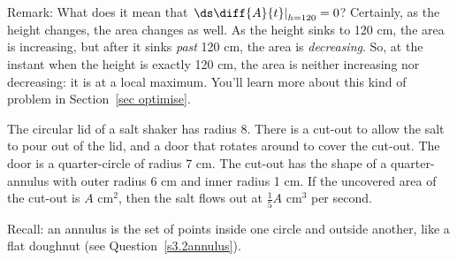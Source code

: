 \begin{solution}
Remark: What does it mean that $\left.\ds\diff{A}{t}\right|_{h=120}=0$? Certainly, as the height changes, the area changes as well. As the height sinks to 120 cm, the area is increasing, but after it sinks \emph{past} 120 cm, the area is \emph{decreasing}. So, at the instant when the height is exactly 120 cm, the area is neither increasing nor decreasing: it is at a local maximum. You'll learn more about this kind of problem in Section~\ref*{sec optimise}.
\end{solution}




\begin{question}\label{s3.2segment}
The circular lid of a salt shaker has radius 8. There is a cut-out to allow the salt to pour out of the lid, and a door that rotates around to cover the cut-out. The door is a quarter-circle of radius 7 cm. The cut-out has the shape of a quarter-annulus with outer radius 6 cm and inner radius 1 cm.
If the uncovered area of the cut-out is $A$ cm$^2$, then the salt flows out at $\frac{1}{5}A$ cm$^3$ per second.

\begin{center}
\hspace{2cm}
\end{center}
Recall: an annulus is the set of points inside one circle and outside another,  like a flat doughnut (see Question~\ref{s3.2annulus}).


\end{question}
